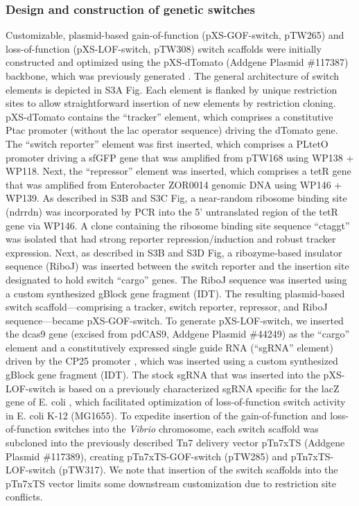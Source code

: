 {{{{{{{\subsubsection{Design and construction of genetic switches}
Customizable, plasmid-based gain-of-function (pXS-GOF-switch, pTW265) and loss-of-function (pXS-LOF-switch, pTW308) switch scaffolds were initially constructed and optimized using the pXS-dTomato (Addgene Plasmid \#117387) backbone, which was previously generated \cite{wiles_modernized_2018}. The general architecture of switch elements is depicted in S3A Fig. Each element is flanked by unique restriction sites to allow straightforward insertion of new elements by restriction cloning. pXS-dTomato contains the ``tracker'' element, which comprises a constitutive Ptac promoter (without the lac operator sequence) \cite{wiles_modernized_2018} driving the dTomato gene. The ``switch reporter'' element was first inserted, which comprises a PLtetO promoter \cite{lutz_independent_1997} driving a sfGFP gene that was amplified from pTW168 using WP138 + WP118. Next, the ``repressor'' element was inserted, which comprises a tetR gene that was amplified from Enterobacter ZOR0014 genomic DNA using WP146 + WP139. As described in S3B and S3C Fig, a near-random ribosome binding site (ndrrdn) was incorporated by PCR into the 5' untranslated region of the tetR gene via WP146. A clone containing the ribosome binding site sequence ``ctaggt'' was isolated that had strong reporter repression/induction and robust tracker expression. Next, as described in S3B and S3D Fig, a ribozyme-based insulator sequence (RiboJ) \cite{lou_ribozyme-based_2012} was inserted between the switch reporter and the insertion site designated to hold switch ``cargo'' genes. The RiboJ sequence was inserted using a custom synthesized gBlock gene fragment (IDT). The resulting plasmid-based switch scaffold—comprising a tracker, switch reporter, repressor, and RiboJ sequence—became pXS-GOF-switch. To generate pXS-LOF-switch, we inserted the dcas9 gene \cite{qi_repurposing_2013} (excised from pdCAS9, Addgene Plasmid \#44249) as the ``cargo'' element and a constitutively expressed single guide RNA (``sgRNA'' element) driven by the CP25 promoter \cite{jensen_sequence_1998}, which was inserted using a custom synthesized gBlock gene fragment (IDT). The stock sgRNA that was inserted into the pXS-LOF-switch is based on a previously characterized sgRNA specific for the lacZ gene of E. coli \cite{qi_repurposing_2013}, which facilitated optimization of loss-of-function switch activity in E. coli K-12 (MG1655). To expedite insertion of the gain-of-function and loss-of-function switches into the \textit{Vibrio} chromosome, each switch scaffold was subcloned into the previously described Tn7 delivery vector pTn7xTS (Addgene Plasmid \#117389), creating pTn7xTS-GOF-switch (pTW285) and pTn7xTS-LOF-switch (pTW317). We note that insertion of the switch scaffolds into the pTn7xTS vector limits some downstream customization due to restriction site conflicts.

}}}}}}}
